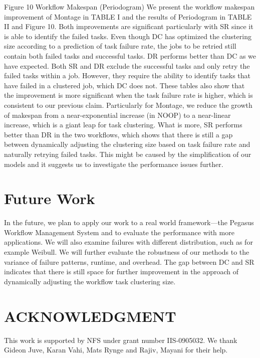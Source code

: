 \documentclass{IOS-Book-Article}
\begin{document}
 
Figure 10	Workflow Makespan (Periodogram)
We present the workflow makespan improvement of Montage in TABLE I and the results of Periodogram in TABLE II and Figure 10. Both improvements are significant particularly with SR since it is able to identify the failed tasks. Even though DC has optimized the clustering size according to a prediction of task failure rate, the jobs to be retried still contain both failed tasks and successful tasks. DR performs better than DC as we have expected. Both SR and DR exclude the successful tasks and only retry the failed tasks within a job. However, they require the ability to identify tasks that have failed in a clustered job, which DC does not. These tables also show that the improvement is more significant when the task failure rate is higher, which is consistent to our previous claim. Particularly for Montage, we reduce the growth of makespan from a near-exponential increase (in NOOP) to a near-linear increase, which is a giant leap for task clustering. What is more, SR performs better than DR in the two workflows, which shows that there is still a gap between dynamically adjusting the clustering size based on task failure rate and naturally retrying failed tasks. This might be caused by the simplification of our models and it suggests us to investigate the performance issues further.


\section{Future Work}

In the future, we plan to apply our work to a real world framework---the Pegasus Workflow Management System and to evaluate the performance with more applications. We will also examine failures with different distribution, such as for example Weibull.  We will further evaluate the robustness of our methods to the variance of failure patterns, runtime, and overhead. The gap between DC and SR indicates that there is still space for further improvement in the approach of dynamically adjusting the workflow task clustering size. 

\section{ACKNOWLEDGMENT}
This work is supported by NFS under grant number IIS-0905032. We thank Gideon Juve, Karan Vahi, Mats Rynge and Rajiv, Mayani for their help. 




\end{document}
